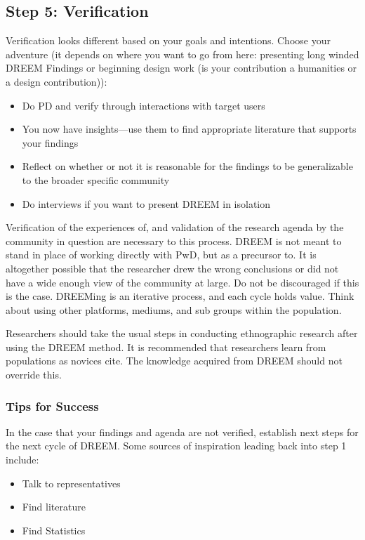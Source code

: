 \subsection{Step 5: Verification}
Verification looks different based on your goals and intentions. 
Choose your adventure (it depends on where you want to go from here: presenting long winded DREEM Findings or beginning design work (is your contribution a humanities or a design contribution)):
\begin{itemize}
\item Do PD and verify through interactions with target users
\item You now have insights—use them to find appropriate literature that supports your findings
\item Reflect on whether or not it is reasonable for the findings to be generalizable to the broader specific community
\item Do interviews if you want to present DREEM in isolation
\end{itemize}

Verification of the experiences of, and validation of the research agenda by the community in question are necessary to this process. DREEM is not meant to stand in place of working directly with PwD, but as a precursor to. It is altogether possible that the researcher drew the wrong conclusions or did not have a wide enough view of the community at large. Do not be discouraged if this is the case. DREEMing is an iterative process, and each cycle holds value.
Think about using other platforms, mediums, and sub groups within the population. 

Researchers should take the usual steps in conducting ethnographic research after using the DREEM method. It is recommended that researchers learn from populations as novices {\color{red}cite}. The knowledge acquired from DREEM should not override this. 

\subsubsection{Tips for Success}

In the case that your findings and agenda are not verified, establish next steps for the next cycle of DREEM. Some sources of inspiration leading back into step 1 include:

\begin{itemize}
\item Talk to representatives
\item Find literature
\item Find Statistics
\end{itemize}


